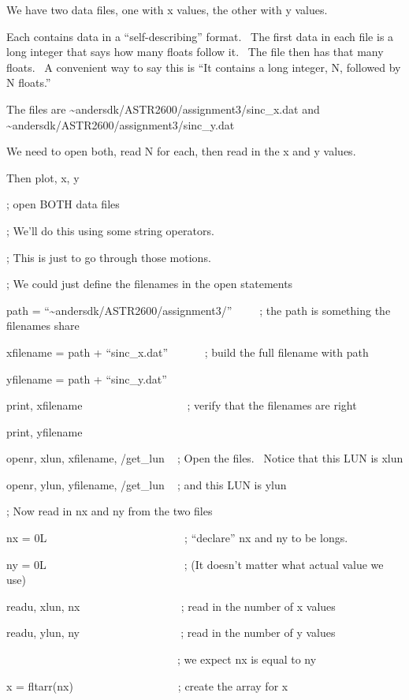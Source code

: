 \documentclass{article}
\begin{document}
\begin{spacing}{1.0}
We have two data files, one with x values, the other with y values.

Each contains data in a ``self-describing'' format.~ The first data in
each file is a long integer that says how many floats follow it.~ The
file then has that many floats.~ A convenient way to say this is ``It
contains a long integer, N, followed by N floats.''

The files are \textasciitilde{}andersdk/ASTR2600/assignment3/sinc\_x.dat
and \textasciitilde{}andersdk/ASTR2600/assignment3/sinc\_y.dat

We need to open both, read N for each, then read in the x and y values.

Then plot, x, y


; open BOTH data files

; We'll do this using some string operators.

; This is just to go through those motions. ~

; We could just define the filenames in the open statements

path = ``\textasciitilde{}andersdk/ASTR2600/assignment3/''~ ~ ~ ; the
path is something the filenames share

xfilename = path + ``sinc\_x.dat''~ ~ ~ ~ ; build the full filename with
path

yfilename = path + ``sinc\_y.dat''

print, xfilename ~ ~ ~ ~ ~ ~ ~ ~ ~ ~ ~ ; verify that the filenames are
right

print, yfilename

openr, xlun, xfilename, /get\_lun ~ ; Open the files.~ Notice that this
LUN is xlun

openr, ylun, yfilename, /get\_lun ~ ; and this LUN is ylun


; Now read in nx and ny from the two files

nx = 0L~ ~ ~ ~ ~ ~ ~ ~ ~ ~ ~ ~ ~ ~ ~ ; ``declare'' nx and ny to be
longs.

ny = 0L~ ~ ~ ~ ~ ~ ~ ~ ~ ~ ~ ~ ~ ~ ~ ; (It doesn't matter what actual
value we use)

readu, xlun, nx~ ~ ~ ~ ~ ~ ~ ~ ~ ~ ~ ; read in the number of x values

readu, ylun, ny~ ~ ~ ~ ~ ~ ~ ~ ~ ~ ~ ; read in the number of y values

~~ ~ ~ ~ ~ ~ ~ ~ ~ ~ ~ ~ ~ ~ ~ ~ ~ ~ ; we expect nx is equal to ny


x = fltarr(nx) ~ ~ ~ ~ ~ ~ ~ ~ ~ ~ ~ ; create the array for x


\end{spacing}
\end{document}
